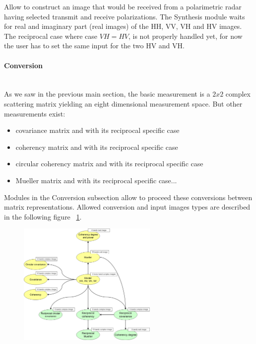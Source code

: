 Allow to construct an image that would be received from a polarimetric radar 
having selected transmit and receive polarizations.
The Synthesis module waits for real and imaginary part (real images) of the HH, VV, VH and HV images.
The reciprocal case where case $VH=HV$, is not properly handled yet, for now the user
has to set the same input for the two HV and VH.

\paragraph{Conversion} \\

As we saw in the previous main section, the basic 
measurement is a $2x2$ complex scattering matrix yielding an eight dimensional 
measurement space. But other measurements exist:
\begin{itemize}
\item covariance matrix and with its reciprocal specific case
\item coherency matrix and with its reciprocal specific case
\item circular coherency matrix and with its reciprocal specific case
\item Mueller matrix and with its reciprocal specific case...
\end{itemize}

Modules in the Conversion subsection allow to proceed these conversions between matrix representations.
Allowed conversion and input images types are described in the following figure ~\ref{fig:sarpolconv}.

\begin{figure}
  \center
  \includegraphics[width=0.6\textwidth]{../Art/MonteverdiImages/monteverdi_sarpol_conversion_schema.png}
  \label{fig:sarpolconv}
\end{figure}

